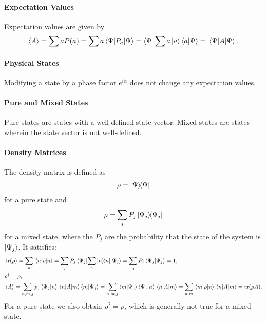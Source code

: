 \paragraph{Expectation Values}
Expectation values are given by
\begin{align*}
	\expval{A} = \sum aP(a) = \sum a\expval{P_{a}}{\Psi} = \bra{\Psi}\sum a\ket{a}\bra{a}\ket{\Psi} = \expval{A}{\Psi}.
\end{align*}

\paragraph{Physical States}
Modifying a state by a phase factor $e^{i\alpha}$ does not change any expectation values.

\paragraph{Pure and Mixed States}
Pure states are states with a well-defined state vector. Mixed states are states wherein the state vector is not well-defined.

\paragraph{Density Matrices}
The density matrix is defined as
\begin{align*}
	\rho = \op{\Psi}{\Psi}
\end{align*}
for a pure state and
\begin{align*}
	\rho = \sum\limits_{j}P_{j}\op{\Psi_{j}}{\Psi_{j}}
\end{align*}
for a mixed state, where the $P_{j}$ are the probability that the state of the system is $\ket{\Psi_{j}}$. It satisfies:
\begin{align*}
	&\tr(\rho) = \sum\limits_{n}\expval{\rho}{n} = \sum\limits_{j}P_{j}\ev{\sum\limits_{n}\op{n}{n}}{\Psi_{j}} = \sum\limits_{j}P_{j}\braket{\Psi_{j}} = 1, \\
	&\adj{\rho} = \rho, \\
	&\expval{A} = \sum\limits_{n, m, j}p_{j}\braket{\Psi_{j}}{n}\mel{n}{A}{m}\braket{m}{\Psi_{j}} = \sum\limits_{n, m, j}\braket{m}{\Psi_{j}}\braket{\Psi_{j}}{n}\mel{n}{A}{m} = \sum\limits_{n, m}\mel{m}{\rho}{n}\mel{n}{A}{m} = \tr(\rho A).
\end{align*}
For a pure state we also obtain $\rho^{2} = \rho$, which is generally not true for a mixed state.

